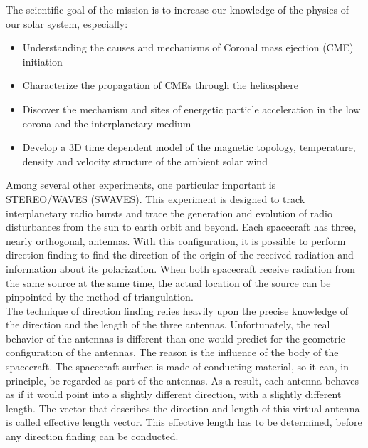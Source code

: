 \documentclass[a4paper,14pt]{extbook}
\begin{document}
The scientific goal of the mission is to increase our knowledge of the physics of our solar system, especially:

\begin{itemize}
\item Understanding the causes and mechanisms of Coronal mass ejection (CME) initiation
\item Characterize the propagation of CMEs through the heliosphere
\item Discover the mechanism and sites of energetic particle acceleration in the low corona and the interplanetary medium
\item Develop a 3D time dependent model of the magnetic topology, temperature, density and velocity structure of the ambient solar wind
\end{itemize}


Among several other experiments, one particular important is \\
STEREO/WAVES (SWAVES). This experiment is designed to track interplanetary radio bursts and trace the generation and evolution of radio disturbances from the sun to earth orbit and beyond. Each spacecraft has three, nearly orthogonal, antennas. With this configuration, it is possible to perform direction finding to find the direction of the origin of the received radiation and information about its polarization. When both spacecraft receive radiation from the same source at the same time, the actual location of the source can be pinpointed by the method of triangulation.\\

The technique of direction finding relies heavily upon the precise knowledge of the direction and the length of the three antennas. Unfortunately, the real behavior of the antennas is different than one would predict for the geometric configuration of the antennas. The reason is the influence of the body of the spacecraft. The spacecraft surface is made of conducting material, so it can, in principle, be regarded as part of the antennas. As a result, each antenna behaves as if it would point into a slightly different direction, with a slightly different length. The vector that describes the direction and length of this virtual antenna is called effective length vector. This effective length has to be determined, before any direction finding can be conducted.\\
\end{document}
